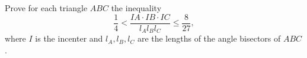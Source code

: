 Prove for each triangle $ABC$ the inequality
\[ \frac{1}{4} < \frac{IA \cdot IB \cdot IC}{l_A l_B l_C} \leq \frac{8}{27}, \]
where $I$ is the incenter and $l_A, l_B, l_C$ are the lengths of the angle bisectors of $ABC$.
